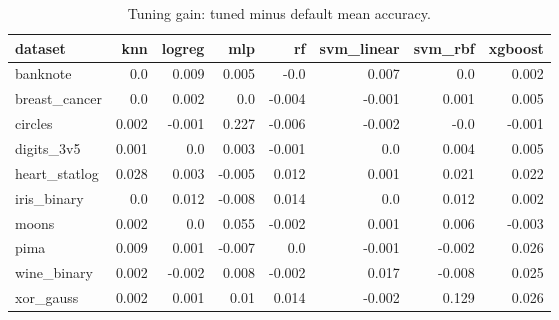 \begin{table}[ht]
\centering
\caption{Tuning gain: tuned minus default mean accuracy.}
\label{tab:e1-delta-accuracy}
\begin{tabular}{lrrrrrrr}
\toprule
dataset & knn & logreg & mlp & rf & svm\_linear & svm\_rbf & xgboost \\
\midrule
banknote & 0.0 & 0.009 & 0.005 & -0.0 & 0.007 & 0.0 & 0.002 \\
breast\_cancer & 0.0 & 0.002 & 0.0 & -0.004 & -0.001 & 0.001 & 0.005 \\
circles & 0.002 & -0.001 & 0.227 & -0.006 & -0.002 & -0.0 & -0.001 \\
digits\_3v5 & 0.001 & 0.0 & 0.003 & -0.001 & 0.0 & 0.004 & 0.005 \\
heart\_statlog & 0.028 & 0.003 & -0.005 & 0.012 & 0.001 & 0.021 & 0.022 \\
iris\_binary & 0.0 & 0.012 & -0.008 & 0.014 & 0.0 & 0.012 & 0.002 \\
moons & 0.002 & 0.0 & 0.055 & -0.002 & 0.001 & 0.006 & -0.003 \\
pima & 0.009 & 0.001 & -0.007 & 0.0 & -0.001 & -0.002 & 0.026 \\
wine\_binary & 0.002 & -0.002 & 0.008 & -0.002 & 0.017 & -0.008 & 0.025 \\
xor\_gauss & 0.002 & 0.001 & 0.01 & 0.014 & -0.002 & 0.129 & 0.026 \\
\bottomrule
\end{tabular}
\end{table}
